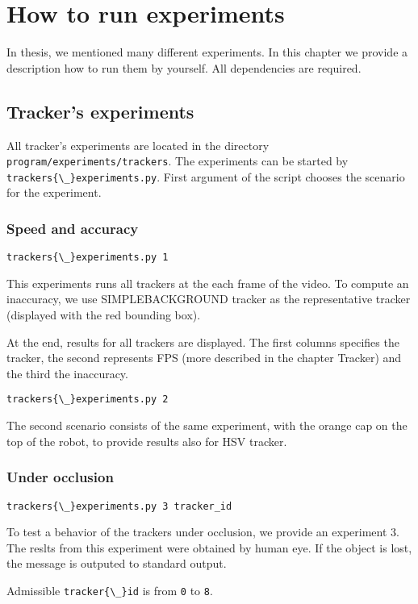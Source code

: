 \chapter{How to run experiments}

In thesis, we mentioned many different experiments. In this chapter we provide
a description how to run them by yourself. All dependencies are required.

\section{Tracker's experiments}

All tracker's experiments are located in the directory
\verb+program/experiments/trackers+. The experiments can be started by \verb+trackers{\_}experiments.py+. First argument of the script chooses the scenario for the experiment.

\subsection*{Speed and accuracy}

\verb+trackers{\_}experiments.py 1+

This experiments runs all trackers at the each frame of the video. To compute
an inaccuracy, we use SIMPLEBACKGROUND tracker as the representative tracker
(displayed with the red bounding box).

At the end, results for all trackers are displayed. The first columns specifies
the tracker, the second represents FPS (more described in the chapter Tracker)
and the third the inaccuracy.

\verb+trackers{\_}experiments.py 2+

The second scenario consists of the same experiment, with the orange cap on the
top of the robot, to provide results also for HSV tracker.

\subsection*{Under occlusion}

\verb+trackers{\_}experiments.py 3 tracker_id+

To test a behavior of the trackers under occlusion, we provide an experiment 3.
The reslts from this experiment were obtained by human eye. If the object is
lost, the message is outputed to standard output.

Admissible \verb+tracker{\_}id+ is from \verb+0+ to \verb+8+.

